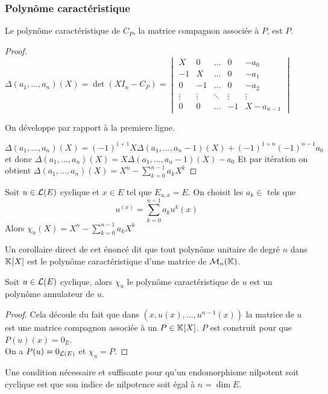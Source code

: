 \subsubsection{Polynôme caractéristique }

\begin{prop}
	Le polynôme caractéristique de $C_P$, la matrice compagnon associée à $P$, est $P$.
\end{prop}

\begin{proof}
	$\Delta(a_1, \ldots, a_n)(X) = \det (XI_n - C_P) =
		\begin{vmatrix}
			X      & 0      & \ldots & 0      & -a_0      \\
			-1     & X      & \ldots & 0      & -a_1      \\
			0      & -1     & \ldots & 0      & -a_2      \\
			\vdots & \vdots & \ddots & \vdots & \vdots    \\
			0      & 0      & \ldots & -1     & X-a_{n-1}
		\end{vmatrix}$

	On développe par rapport à la premiere ligne.

	$$ \Delta(a_1, \ldots, a_n)(X) = (-1)^{1+1}X\Delta(a_1, \ldots, a_n-1)(X) + (-1)^{1+n}(-1)^{n-1}a_0$$
	et donc $\Delta(a_1, \ldots, a_n)(X) = X\Delta(a_1, \ldots, a_n-1)(X) - a_0 $
	Et par itération on obtient $\Delta(a_1, \ldots, a_n)(X) = X^n - \sum_{k=0}^{n-1} a_k X^k$
\end{proof}



\begin{prop}
	Soit $u \in \mathcal{L}(E)$ cyclique et $x \in E$ tel que $E_{u,x} = E$. On choisit les $a_k \in $ tels que
	$$u ^(x) = \sum_{k=0}^{n-1} a_k u^k(x)$$
	Alors $\chi_u (X) = X^n - \sum_{k=0}^{n-1} a_k X^k$
\end{prop}

\begin{remarque}
	Un corollaire direct de cet énoncé dit que tout polynôme unitaire de degré $n$ dans $\mathbb{K}[X]$ est le polynôme caractéristique
	d'une matrice de $\mathcal{M}_n(\mathbb{K})$.
\end{remarque}

\begin{theorem}
	Soit $u \in \mathcal{L}(E)$ cyclique, alors $\chi_u $ le polynôme caractéristique de $u$ est un
	polynôme annulateur de $u$.
\end{theorem}

\begin{proof}
	Cela découle du fait que dans $(x, u(x), \ldots, u^{n-1}(x))$ la matrice de $u$ est une matrice compagnon associée à un $P \in \mathbb{K}[X]$.
	$P$ est construit pour que $P(u)(x) = 0_E$.\\
	On a $P(u) = 0_{\mathcal{L}(E)}$ et $\chi_u = P$.
\end{proof}


\begin{example}
	Une condition nécessaire et suffisante pour qu'un endomorphisme nilpotent soit cyclique est
	que son indice de nilpotence soit égal à $n = \dim E$.
\end{example}
